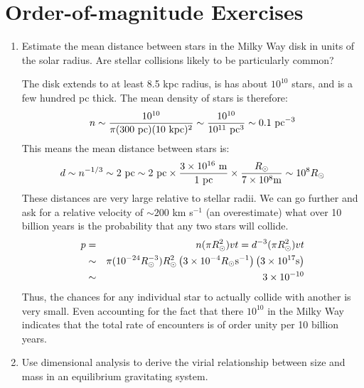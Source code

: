 \section{Order-of-magnitude Exercises}

\begin{enumerate} 
\item Estimate the mean distance between stars in the Milky Way disk
  in units of the solar radius. Are stellar collisions likely to be
  particularly common?

\begin{answer}
The disk extends to at least 8.5 kpc radius, is has about $10^{10}$
stars, and is a few hundred pc thick. The mean density of stars is
therefore:
\begin{equation}
n \sim \frac{10^{10}}{\pi (300 {\rm ~pc}) (10 {\rm ~kpc})^2} \sim
\frac{10^{10}}{10^{11} {\rm ~pc}^3} \sim  0.1 {\rm ~pc}^{-3} 
\end{equation}
This means the mean distance between stars is:
\begin{equation}
d \sim n^{-1/3} \sim 2 {\rm ~pc} \sim 2 {\rm ~pc} \times \frac{3 \times
  10^{16} {\rm ~m}}{1 {\rm ~pc}} \times \frac{R_\odot}{7 \times 10^8 {\rm
    m}}
\sim 10^8 R_\odot
\end{equation}
These distances are very large relative to stellar radii. We can go
further and ask for a relative velocity of $\sim 200$ km s$^{-1}$ (an
overestimate) what over 10 billion years is the probability that any
two stars will collide.
\begin{eqnarray}
  p &=& n (\pi R_\odot^2) v t = d^{-3} (\pi R_\odot^2) v t \cr
  &\sim& \pi (10^{-24} R_\odot^{-3}) R_\odot^2 \left(3 \times
  10^{-4} R_\odot {\rm s}^{-1}\right) \left(3 \times 10^{17} {\rm
    s}\right) \cr
  &\sim& 3 \times 10^{-10} 
\end{eqnarray}
Thus, the chances for any individual star to actually collide with
another is very small. Even accounting for the fact that there
$10^{10}$ in the Milky Way indicates that the total rate of encounters
is of order unity per 10 billion years.
\end{answer}
\item Use dimensional analysis to derive the virial relationship
between size and mass in an equilibrium gravitating system.


\end{enumerate}
